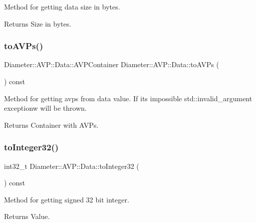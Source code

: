 Method for getting data size in bytes. 

\begin{DoxyReturn}{Returns}
Size in bytes. 
\end{DoxyReturn}
\mbox{\label{classDiameter_1_1AVP_1_1Data_ab62da271ed4bab26b26e497cc33e5955}} 
\subsubsection{\texorpdfstring{to\+A\+V\+Ps()}{toAVPs()}}
{\footnotesize\ttfamily Diameter\+::\+A\+V\+P\+::\+Data\+::\+A\+V\+P\+Container Diameter\+::\+A\+V\+P\+::\+Data\+::to\+A\+V\+Ps (\begin{DoxyParamCaption}{ }\end{DoxyParamCaption}) const}



Method for getting avps from data value. If it\textquotesingle{}s impossible std\+::invalid\+\_\+argument exceptionw will be thrown. 

\begin{DoxyReturn}{Returns}
Container with A\+V\+Ps. 
\end{DoxyReturn}
\mbox{\label{classDiameter_1_1AVP_1_1Data_a6af0bac449276561f6fc49cccc4d422f}} 
\subsubsection{\texorpdfstring{to\+Integer32()}{toInteger32()}}
{\footnotesize\ttfamily int32\+\_\+t Diameter\+::\+A\+V\+P\+::\+Data\+::to\+Integer32 (\begin{DoxyParamCaption}{ }\end{DoxyParamCaption}) const}



Method for getting signed 32 bit integer. 

\begin{DoxyReturn}{Returns}
Value. 
\end{DoxyReturn}
\mbox{\label{classDiameter_1_1AVP_1_1Data_afbff0ff7081269e95f52a47924f92abb}} 
